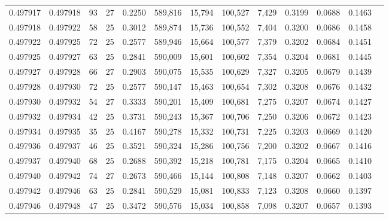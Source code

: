 \begin{tabular}{rrrrrrrrrrrrr}
0.497917 & 0.497918 &  93 &  27 &                                     0.2250 & 589,816 &  15,794 & 100,527 &   7,429 & 0.3199 & 0.0688 & 0.1463 \\
0.497918 & 0.497922 &  58 &  25 &                                     0.3012 & 589,874 &  15,736 & 100,552 &   7,404 & 0.3200 & 0.0686 & 0.1458 \\
0.497922 & 0.497925 &  72 &  25 &                                     0.2577 & 589,946 &  15,664 & 100,577 &   7,379 & 0.3202 & 0.0684 & 0.1451 \\
0.497925 & 0.497927 &  63 &  25 &                                     0.2841 & 590,009 &  15,601 & 100,602 &   7,354 & 0.3204 & 0.0681 & 0.1445 \\
0.497927 & 0.497928 &  66 &  27 &                                     0.2903 & 590,075 &  15,535 & 100,629 &   7,327 & 0.3205 & 0.0679 & 0.1439 \\
0.497928 & 0.497930 &  72 &  25 &                                     0.2577 & 590,147 &  15,463 & 100,654 &   7,302 & 0.3208 & 0.0676 & 0.1432 \\
0.497930 & 0.497932 &  54 &  27 &                                     0.3333 & 590,201 &  15,409 & 100,681 &   7,275 & 0.3207 & 0.0674 & 0.1427 \\
0.497932 & 0.497934 &  42 &  25 &                                     0.3731 & 590,243 &  15,367 & 100,706 &   7,250 & 0.3206 & 0.0672 & 0.1423 \\
0.497934 & 0.497935 &  35 &  25 &                                     0.4167 & 590,278 &  15,332 & 100,731 &   7,225 & 0.3203 & 0.0669 & 0.1420 \\
0.497936 & 0.497937 &  46 &  25 &                                     0.3521 & 590,324 &  15,286 & 100,756 &   7,200 & 0.3202 & 0.0667 & 0.1416 \\
0.497937 & 0.497940 &  68 &  25 &                                     0.2688 & 590,392 &  15,218 & 100,781 &   7,175 & 0.3204 & 0.0665 & 0.1410 \\
0.497940 & 0.497942 &  74 &  27 &                                     0.2673 & 590,466 &  15,144 & 100,808 &   7,148 & 0.3207 & 0.0662 & 0.1403 \\
0.497942 & 0.497946 &  63 &  25 &                                     0.2841 & 590,529 &  15,081 & 100,833 &   7,123 & 0.3208 & 0.0660 & 0.1397 \\
0.497946 & 0.497948 &  47 &  25 &                                     0.3472 & 590,576 &  15,034 & 100,858 &   7,098 & 0.3207 & 0.0657 & 0.1393 \\

\end{tabular}
